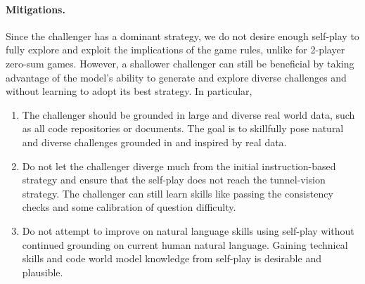 \paragraph{Mitigations.}
Since the challenger has a dominant strategy, we do not desire enough self-play to fully explore and exploit the implications of the game rules, unlike for 2-player zero-sum games. However, a shallower challenger can still be beneficial by taking advantage of the model's ability to  generate and explore diverse challenges and without learning to adopt its best strategy.
In particular,
\begin{enumerate}
    \item The challenger should be grounded in large and diverse real world data, such as all code repositories or documents. The goal is to skillfully pose natural and diverse challenges grounded in and inspired by real data. 
    \item Do not let the challenger diverge much from the initial instruction-based strategy and ensure that the self-play does not reach the tunnel-vision strategy. The challenger can still learn skills like passing the consistency checks and some calibration of question difficulty.
    \item Do not attempt to improve on natural language skills using self-play without continued grounding on current human natural language. Gaining technical skills and code world model knowledge from self-play is desirable and plausible.
\end{enumerate}





